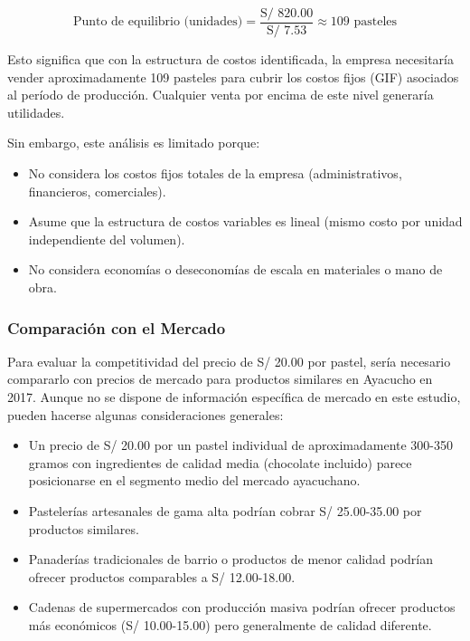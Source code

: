 \documentclass[
  stu,
  floatsintext,
  longtable,
  a4paper,
  nolmodern,
  notxfonts,
  notimes,
  12pt,
  colorlinks=true,linkcolor=blue,citecolor=blue,urlcolor=blue]{apa7}
\providecommand{\tightlist}{%
  \setlength{\itemsep}{0pt}\setlength{\parskip}{0pt}}
\begin{document}
\[
\text{Punto de equilibrio (unidades)} = \frac{\text{S/ 820.00}}{\text{S/ 7.53}} \approx 109 \text{ pasteles}
\]

Esto significa que con la estructura de costos identificada, la empresa
necesitaría vender aproximadamente 109 pasteles para cubrir los costos
fijos (GIF) asociados al período de producción. Cualquier venta por
encima de este nivel generaría utilidades.

Sin embargo, este análisis es limitado porque:

\begin{itemize}
\tightlist
\item
  No considera los costos fijos totales de la empresa (administrativos,
  financieros, comerciales).
\item
  Asume que la estructura de costos variables es lineal (mismo costo por
  unidad independiente del volumen).
\item
  No considera economías o deseconomías de escala en materiales o mano
  de obra.
\end{itemize}

\subsubsection{Comparación con el
Mercado}\label{comparaciuxf3n-con-el-mercado}

Para evaluar la competitividad del precio de S/ 20.00 por pastel, sería
necesario compararlo con precios de mercado para productos similares en
Ayacucho en 2017. Aunque no se dispone de información específica de
mercado en este estudio, pueden hacerse algunas consideraciones
generales:

\begin{itemize}
\tightlist
\item
  Un precio de S/ 20.00 por un pastel individual de aproximadamente
  300-350 gramos con ingredientes de calidad media (chocolate incluido)
  parece posicionarse en el segmento medio del mercado ayacuchano.
\item
  Pastelerías artesanales de gama alta podrían cobrar S/ 25.00-35.00 por
  productos similares.
\item
  Panaderías tradicionales de barrio o productos de menor calidad
  podrían ofrecer productos comparables a S/ 12.00-18.00.
\item
  Cadenas de supermercados con producción masiva podrían ofrecer
  productos más económicos (S/ 10.00-15.00) pero generalmente de calidad
  diferente.
\end{itemize}
\end{document}
